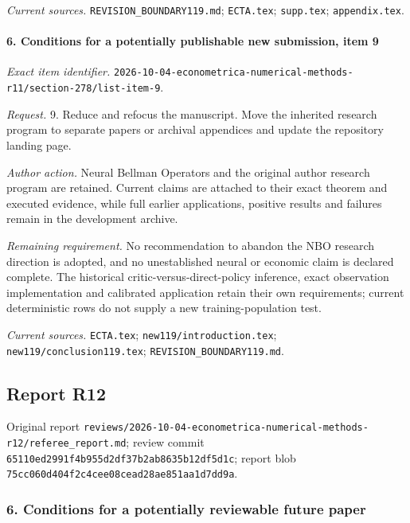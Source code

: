 \par\emph{Current sources.} \nolinkurl{REVISION_BOUNDARY119.md}; \nolinkurl{ECTA.tex}; \nolinkurl{supp.tex}; \nolinkurl{appendix.tex}.

\paragraph{6. Conditions for a potentially publishable new submission, item 9}

\emph{Exact item identifier.} \nolinkurl{2026-10-04-econometrica-numerical-methods-r11/section-278/list-item-9}.

\par\emph{Request.} 9. Reduce and refocus the manuscript. Move the inherited research program to separate papers or archival appendices and update the repository landing page.

\par\emph{Author action.} Neural Bellman Operators and the original author research program are retained. Current claims are attached to their exact theorem and executed evidence, while full earlier applications, positive results and failures remain in the development archive.

\par\emph{Remaining requirement.} No recommendation to abandon the NBO research direction is adopted, and no unestablished neural or economic claim is declared complete. The historical critic-versus-direct-policy inference, exact observation implementation and calibrated application retain their own requirements; current deterministic rows do not supply a new training-population test.

\par\emph{Current sources.} \nolinkurl{ECTA.tex}; \nolinkurl{new119/introduction.tex}; \nolinkurl{new119/conclusion119.tex}; \nolinkurl{REVISION_BOUNDARY119.md}.

\subsection{Report R12}

Original report \nolinkurl{reviews/2026-10-04-econometrica-numerical-methods-r12/referee_report.md}; review commit \nolinkurl{65110ed2991f4b955d2df37b2ab8635b12df5d1c}; report blob \nolinkurl{75cc060d404f2c4cee08cead28ae851aa1d7dd9a}.

\subsubsection{6. Conditions for a potentially reviewable future paper}

